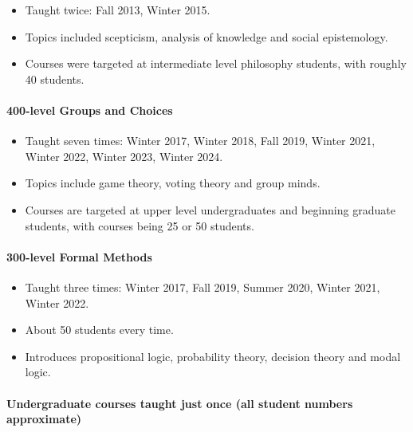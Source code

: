 \documentclass[
  10pt,
  letterpaper,
  DIV=11,
  numbers=noendperiod,
  twoside]{scrartcl}
\let\oldparagraph\paragraph
\renewcommand{\paragraph}[1]{\oldparagraph{#1}\mbox{}}
\providecommand{\tightlist}{%
  \setlength{\itemsep}{0pt}\setlength{\parskip}{0pt}}\usepackage{longtable,booktabs,array}
\begin{document}
\begin{itemize}
\tightlist
\item
  Taught twice: Fall 2013, Winter 2015.
\item
  Topics included scepticism, analysis of knowledge and social
  epistemology.
\item
  Courses were targeted at intermediate level philosophy students, with
  roughly 40 students.
\end{itemize}

\paragraph{400-level Groups and Choices}\label{level-groups-and-choices}

\begin{itemize}
\tightlist
\item
  Taught seven times: Winter 2017, Winter 2018, Fall 2019, Winter 2021,
  Winter 2022, Winter 2023, Winter 2024.
\item
  Topics include game theory, voting theory and group minds.
\item
  Courses are targeted at upper level undergraduates and beginning
  graduate students, with courses being 25 or 50 students.
\end{itemize}

\paragraph{300-level Formal Methods}\label{level-formal-methods}

\begin{itemize}
\tightlist
\item
  Taught three times: Winter 2017, Fall 2019, Summer 2020, Winter 2021,
  Winter 2022.
\item
  About 50 students every time.
\item
  Introduces propositional logic, probability theory, decision theory
  and modal logic.
\end{itemize}

\paragraph{Undergraduate courses taught just once (all student numbers
approximate)}\label{undergraduate-courses-taught-just-once-all-student-numbers-approximate}
\end{document}
